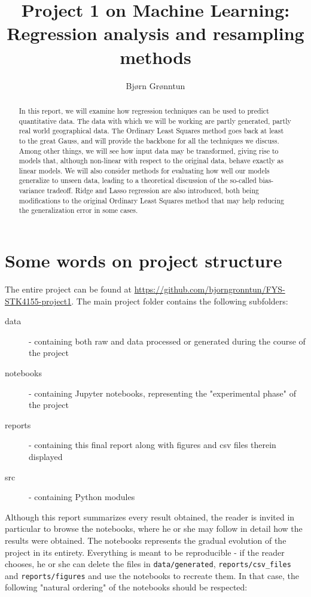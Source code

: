 \documentclass{article}
\title{Project 1 on Machine Learning: Regression analysis and resampling methods}
\author{Bj{\o}rn Gr{\o}nntun}
\begin{document}
\maketitle
\begin{abstract}
    In this report, we will examine how regression techniques can be used to predict quantitative data. The data with which we will be working are partly generated, partly real world geographical data. The Ordinary Least Squares method goes back at least to the great Gauss, and will provide the backbone for all the techniques we discuss. Among other things, we will see how input data may be transformed, giving rise to models that, although non-linear with respect to the original data, behave exactly as linear models. We will also consider methods for evaluating how well our models generalize to unseen data, leading to a theoretical discussion of the so-called bias-variance tradeoff. Ridge and Lasso regression are also introduced, both being modifications to the original Ordinary Least Squares method that may help reducing the generalization error in some cases.
\end{abstract}
\section*{Some words on project structure}
The entire project can be found at \url{https://github.com/bjorngronntun/FYS-STK4155-project1}. The main project folder contains the following subfolders:
\begin{description}
    \item[data] - containing both raw and data processed or generated during the course of the project
    \item[notebooks] - containing Jupyter notebooks, representing the "experimental phase" of the project
    \item[reports] - containing this final report along with figures and csv files therein displayed
    \item[src] - containing Python modules
\end{description}

Although this report summarizes every result obtained, the reader is invited in particular to browse the notebooks, where he or she may follow in detail how the results were obtained. The notebooks represents the gradual evolution of the project in its entirety. Everything is meant to be reproducible - if the reader chooses, he or she can delete the files in \texttt{data/generated}, \texttt{reports/csv\_files} and  \texttt{reports/figures} and use the notebooks to recreate them. In that case, the following "natural ordering" of the notebooks should be respected:
\end{document}
